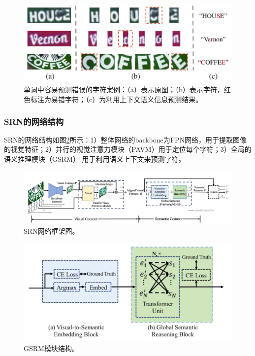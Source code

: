 \begin{figure}[H]
    \centering
    \includegraphics[width=.8\textwidth]{figure/recognition/srn_introduction.png} 
    \caption{单词中容易预测错误的字符案例：（a）表示原图；（b）表示字符，红色标注为易错字符；（c）为利用上下文语义信息预测结果。} 
    \label{srn_introduction} 
\end{figure}

\subsubsection{SRN的网络结构}
SRN的网络结构如图\ref{srn_framework}所示：1）整体网络的backbone为FPN网络，用于提取图像的视觉特征；2）并行的视觉注意力模块（PAVM）用于定位每个字符；3）全局的语义推理模块（GSRM）
用于利用语义上下文来预测字符。
\begin{figure}[H]
    \centering
    \includegraphics[width=.98\textwidth]{figure/recognition/srn_framework.png} 
    \caption{SRN网络框架图。} 
    \label{srn_framework} 
\end{figure}

\begin{figure}[H]
    \centering
    \includegraphics[width=.8\textwidth]{figure/recognition/srn_gsrm.png} 
    \caption{GSRM模块结构。} 
    \label{srn_gsrm} 
\end{figure}
